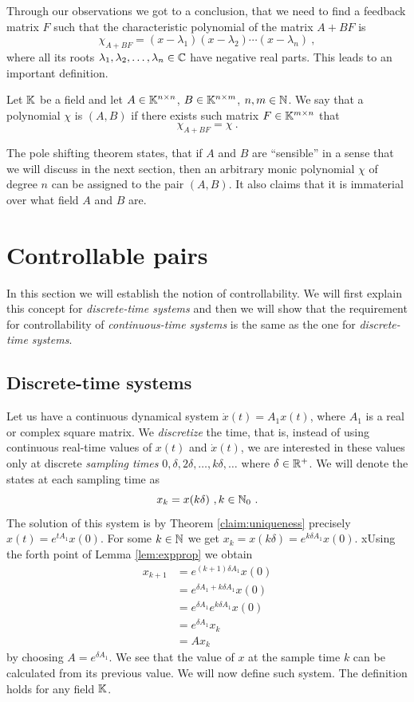 Through our observations we got to a conclusion, that we need to find a feedback matrix $F$ such that the characteristic polynomial of the matrix $A+BF$ is $$\chi_{A+BF}=(x-\lambda_1)(x-\lambda_2)\cdots(x-\lambda_n)\ ,$$ where all its roots $\lambda_1,\lambda_2,\ldots,\lambda_n \in \mathbb{C}$ have negative real parts. This leads to an important definition.

\begin{definition}
    Let $\mathbb{K}$ be a field and let $A \in \mathbb{K}^{n \times n}$, $B \in \mathbb{K}^{n \times m}$, $n,m \in \mathbb{N}$. We say that a polynomial $\chi$ is  $(A,B)$ if there exists such matrix $F\in\mathbb{K}^{m \times n}$ that $$\chi_{A+BF}=\chi\ .$$
\end{definition}

The pole shifting theorem states, that if $A$ and $B$ are ``sensible'' in a sense that we will discuss in the next section, then an arbitrary monic polynomial $\chi$ of degree $n$ can be assigned to the pair $(A,B)$. It also claims that it is immaterial over what field $A$ and $B$ are.

\section{Controllable pairs}

In this section we will establish the notion of controllability. We will first explain this concept for \textit{discrete-time systems} and then we will show that the requirement for controllability of \textit{continuous-time systems} is the same as the one for \textit{discrete-time systems}.

\subsection{Discrete-time systems}

Let us have a continuous dynamical system $\dot{x}(t)=A_1x(t)$, where $A_1$ is a real or complex square matrix. We \textit{discretize} the time, that is, instead of using continuous real-time values of $x(t)$ and $\dot{x}(t)$, we are interested in these values only at discrete \textit{sampling times} $0,\delta,2\delta,\ldots,k\delta,\ldots$ where $\delta\in\mathbb{R}^+$. We will denote the states at each sampling time as
$$x_k=x(k\delta)\ ,k\in\mathbb{N}_0\ .$$
The solution of this system is by Theorem \ref{claim:uniqueness} precisely $x(t)=e^{tA_1}x(0)$. For some $k\in\mathbb{N}$ we get $x_k=x(k\delta)=e^{k\delta A_1}x(0)$. xUsing the forth point of Lemma \ref{lem:expprop} we obtain 
\begin{align*}
	x_{k+1}
	&=e^{(k+1)\delta A_1}x(0) \\
	&=e^{\delta A_1 +k\delta A_1}x(0) \\
	&=e^{\delta A_1}e^{k\delta A_1}x(0) \\
	&=e^{\delta A_1}x_k \\
	&=Ax_k
\end{align*}
by choosing $A=e^{\delta A_1}$. We see that the value of $x$ at the sample time $k$ can be calculated from its previous value. We will now define such system. The definition holds for any field $\mathbb{K}$.

